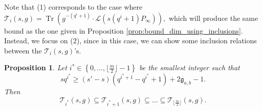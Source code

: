 \documentclass[a4paper]{amsart}
\newtheorem{proposition}[thm]{Proposition}
\theoremstyle{definition}
\theoremstyle{remark}
\newcommand{\calL}{\mathcal{L}}
\newcommand{\calT}{\mathcal{T}}
\newcommand{\Tr}[1]{\operatorname{Tr}\left(#1\right)}
\newcommand{\set}[1]{\left\{#1\right\}}
\begin{document}
Note that (1) corresponds to the case where $\calT_i(s,g) = \Tr{g^{-(q^i+1)}\cdot \calL(s(q^i+1)P_\infty)}, $ which will produce the same bound as the one given in Proposition \ref{prop:bound_dim_using_inclusions}.
Instead, we focus on (2), since in this case, we can show some inclusion relations between the $\calT_i(s,g)$'s.


\begin{proposition} \label{prop:inclusion_T_i's} Let $i^* \in \set{0,\dots,\lfloor\frac{m}{2}\rfloor-1}$ be the smallest integer such that 
\begin{equation} \label{eq:cond_s_s'_i_star}
sq^{i^*} \geq (s'-s)(q^{i^*+1}-q^{i^{*}}+1)+2\mathfrak{g}_{a,b}-1.
\end{equation} 
Then
$$\calT_{i^*}(s,g) \subseteq \calT_{i^*+1}(s,g) \subseteq \dots \subseteq \calT_{\lfloor \frac{m}{2}\rfloor}(s,g).$$
\end{proposition}
\end{document}

